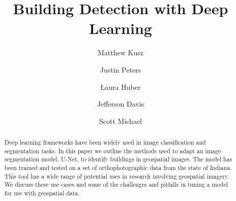 \documentclass[acmtog, authorversion]{acmart}
\begin{document}
\title{Building Detection with Deep Learning}


\author{Matthew Kusz}

\author{Justin Peters}

\author{Laura Huber}

\author{Jefferson Davis}

\author{Scott Michael}

\renewcommand{\shortauthors}{Kusz and Peters, et al.}

\newif\ifdraft
\ifdraft
\newcommand{\note}[1]{ {\textcolor{blue} { ***NOTE: #1 }}}
\newcommand{\scott}[1]{ {\textcolor{red} { ***Scott: #1 }}}
\newcommand{\justin}[1]{ {\textcolor{green} {***Justin: #1}}}
\newcommand{\laura}[1]{ {\textcolor{orange} { ***Laura: #1 }}}
\else
\newcommand{\note}[1]{ {}}
\newcommand{\scott}[1]{ {}}
\newcommand{\justin}[1]{ {}}
\newcommand{\laura}[1]{ {}}
\fi

\begin{abstract}
Deep learning frameworks have been widely used in image classification and segmentation tasks. In this paper we outline the methods used to  adapt an image segmentation model, U-Net, to identify buildings in geospatial images. The model has been trained and tested on a set of orthophotographic data from the state of Indiana. This tool has a wide range of potential uses in research involving geospatial imagery.  We discuss these use cases and some of the challenges and pitfalls in tuning a model for use with geospatial data.
\end{abstract}
\end{document}
